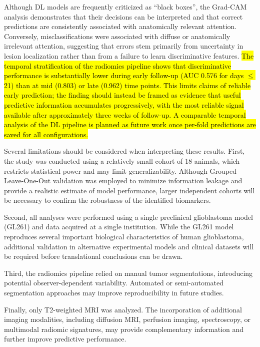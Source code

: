 \documentclass{article}
\begin{document}
Although DL models are frequently criticized as ``black boxes'', the Grad-CAM analysis demonstrates that their decisions can be interpreted and that correct predictions are consistently associated with anatomically relevant attention. Conversely, misclassifications were associated with diffuse or anatomically irrelevant attention, suggesting that errors stem primarily from uncertainty in lesion localization rather than from a failure to learn discriminative features. \hl{The temporal stratification of the radiomics pipeline shows that discriminative performance is substantially lower during early follow-up (AUC 0.576 for days $\leq$21) than at mid (0.803) or late (0.962) time points. This limits claims of reliable early prediction; the finding should instead be framed as evidence that useful predictive information accumulates progressively, with the most reliable signal available after approximately three weeks of follow-up. A comparable temporal analysis of the DL pipeline is planned as future work once per-fold predictions are saved for all configurations.}

Several limitations should be considered when interpreting these results. First, the study was conducted using a relatively small cohort of 18 animals, which restricts statistical power and may limit generalizability. Although Grouped Leave-One-Out validation was employed to minimize information leakage and provide a realistic estimate of model performance, larger independent cohorts will be necessary to confirm the robustness of the identified biomarkers.

Second, all analyses were performed using a single preclinical glioblastoma model (GL261) and data acquired at a single institution. While the GL261 model reproduces several important biological characteristics of human glioblastoma, additional validation in alternative experimental models and clinical datasets will be required before translational conclusions can be drawn.

Third, the radiomics pipeline relied on manual tumor segmentations, introducing potential observer-dependent variability. Automated or semi-automated segmentation approaches may improve reproducibility in future studies.

Finally, only T2-weighted MRI was analyzed. The incorporation of additional imaging modalities, including diffusion MRI, perfusion imaging, spectroscopy, or multimodal radiomic signatures, may provide complementary information and further improve predictive performance.
\end{document}
